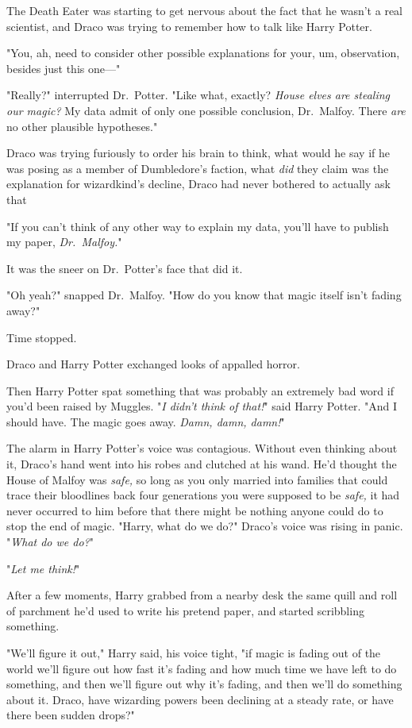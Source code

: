 The Death Eater was starting to get nervous about the fact that he wasn't a
real scientist, and Draco was trying to remember how to talk like Harry Potter.

"You, ah, need to consider other possible explanations for your, um,
observation, besides just this one\mbox{---}"

"Really?" interrupted Dr.~Potter. "Like what, exactly? \emph{House elves are
stealing our magic?} My data admit of only one possible conclusion, Dr.~Malfoy.
There \emph{are} no other plausible hypotheses."

Draco was trying furiously to order his brain to think, what would he say if he
was posing as a member of Dumbledore's faction, what \emph{did} they claim was
the explanation for wizardkind's decline, Draco had never bothered to actually
ask that{\el}

"If you can't think of any other way to explain my data, you'll have to publish
my paper, \emph{Dr.~Malfoy.}"

It was the sneer on Dr.~Potter's face that did it.

"Oh yeah?" snapped Dr.~Malfoy. "How do you know that magic itself isn't fading
away?"

Time stopped.

Draco and Harry Potter exchanged looks of appalled horror.

Then Harry Potter spat something that was probably an extremely bad word if
you'd been raised by Muggles. "\emph{I didn't think of that!}" said Harry
Potter. "And I should have. The magic goes away. \emph{Damn, damn, damn!}"

The alarm in Harry Potter's voice was contagious. Without even thinking about
it, Draco's hand went into his robes and clutched at his wand. He'd thought the
House of Malfoy was \emph{safe,} so long as you only married into families that
could trace their bloodlines back four generations you were supposed to be
\emph{safe,} it had never occurred to him before that there might be nothing
anyone could do to stop the end of magic. "Harry, what do we do?" Draco's voice
was rising in panic. "\emph{What do we do?}"

"\emph{Let me think!}"

After a few moments, Harry grabbed from a nearby desk the same quill and roll
of parchment he'd used to write his pretend paper, and started scribbling
something.

"We'll figure it out," Harry said, his voice tight, "if magic is fading out of
the world we'll figure out how fast it's fading and how much time we have left
to do something, and then we'll figure out why it's fading, and then we'll do
something about it. Draco, have wizarding powers been declining at a steady
rate, or have there been sudden drops?"

